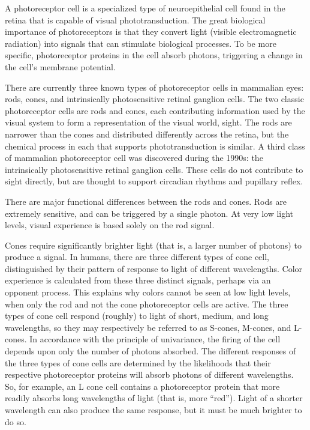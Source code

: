 A photoreceptor cell is a specialized type of neuroepithelial cell found in the retina that is capable of visual phototransduction. The great biological importance of photoreceptors is that they convert light (visible electromagnetic radiation) into signals that can stimulate biological processes. To be more specific, photoreceptor proteins in the cell absorb photons, triggering a change in the cell's membrane potential.

There are currently three known types of photoreceptor cells in mammalian eyes: rods, cones, and intrinsically photosensitive retinal ganglion cells. The two classic photoreceptor cells are rods and cones, each contributing information used by the visual system to form a representation of the visual world, sight. The rods are narrower than the cones and distributed differently across the retina, but the chemical process in each that supports phototransduction is similar. A third class of mammalian photoreceptor cell was discovered during the 1990s: the intrinsically photosensitive retinal ganglion cells. These cells do not contribute to sight directly, but are thought to support circadian rhythms and pupillary reflex.

There are major functional differences between the rods and cones. Rods are extremely sensitive, and can be triggered by a single photon. At very low light levels, visual experience is based solely on the rod signal.

Cones require significantly brighter light (that is, a larger number of photons) to produce a signal. In humans, there are three different types of cone cell, distinguished by their pattern of response to light of different wavelengths. Color experience is calculated from these three distinct signals, perhaps via an opponent process. This explains why colors cannot be seen at low light levels, when only the rod and not the cone photoreceptor cells are active. The three types of cone cell respond (roughly) to light of short, medium, and long wavelengths, so they may respectively be referred to as S-cones, M-cones, and L-cones. In accordance with the principle of univariance, the firing of the cell depends upon only the number of photons absorbed. The different responses of the three types of cone cells are determined by the likelihoods that their respective photoreceptor proteins will absorb photons of different wavelengths. So, for example, an L cone cell contains a photoreceptor protein that more readily absorbs long wavelengths of light (that is, more ``red''). Light of a shorter wavelength can also produce the same response, but it must be much brighter to do so.

